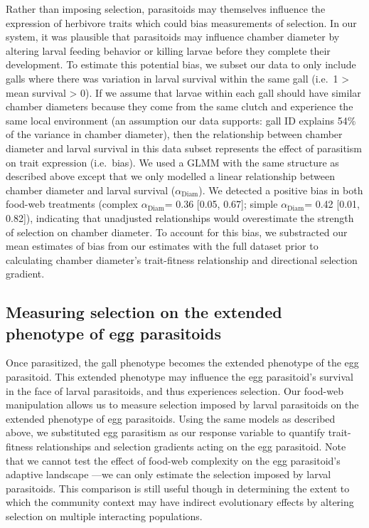 \documentclass[11pt,]{article}
\begin{document}
Rather than imposing selection, parasitoids may themselves influence the
expression of herbivore traits which could bias measurements of
selection. In our system, it was plausible that parasitoids may
influence chamber diameter by altering larval feeding behavior or
killing larvae before they complete their development. To estimate this
potential bias, we subset our data to only include galls where there was
variation in larval survival within the same gall (i.e.~1 \textgreater{}
mean survival \textgreater{} 0). If we assume that larvae within each
gall should have similar chamber diameters because they come from the
same clutch and experience the same local environment (an assumption our
data supports: gall ID explains 54\% of the variance in chamber
diameter), then the relationship between chamber diameter and larval
survival in this data subset represents the effect of parasitism on
trait expression (i.e.~bias). We used a GLMM with the same structure as
described above except that we only modelled a linear relationship
between chamber diameter and larval survival (\(\alpha_{\text{Diam}}\)).
We detected a positive bias in both food-web treatments (complex
\(\alpha_{\text{Diam}}\)= 0.36 {[}0.05, 0.67{]}; simple
\(\alpha_{\text{Diam}}\)= 0.42 {[}0.01, 0.82{]}), indicating that
unadjusted relationships would overestimate the strength of selection on
chamber diameter. To account for this bias, we substracted our mean
estimates of bias from our estimates with the full dataset prior to
calculating chamber diameter's trait-fitness relationship and
directional selection gradient.

\subsection{Measuring selection on the extended phenotype of egg
parasitoids}\label{measuring-selection-on-the-extended-phenotype-of-egg-parasitoids}

Once parasitized, the gall phenotype becomes the extended phenotype of
the egg parasitoid. This extended phenotype may influence the egg
parasitoid's survival in the face of larval parasitoids, and thus
experiences selection. Our food-web manipulation allows us to measure
selection imposed by larval parasitoids on the extended phenotype of egg
parasitoids. Using the same models as described above, we substituted
egg parasitism as our response variable to quantify trait-fitness
relationships and selection gradients acting on the egg parasitoid. Note
that we cannot test the effect of food-web complexity on the egg
parasitoid's adaptive landscape ---we can only estimate the selection
imposed by larval parasitoids. This comparison is still useful though in
determining the extent to which the community context may have indirect
evolutionary effects by altering selection on multiple interacting
populations.
\end{document}
